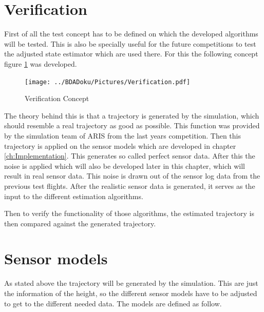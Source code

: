 % 
%   

  
  \section{Verification}
  First of all the test concept has to be defined on which the developed algorithms will be tested.
  This is also be specially useful for the future competitions to test the adjusted state estimator which are used there.
  For this the following concept figure \ref{fig:Verification} was developed.
  
  \begin{figure}[h!]
   \centering
   \texttt{[image: ../BDADoku/Pictures/Verification.pdf]}
   \caption{Verification Concept}
   \label{fig:Verification}
  \end{figure}

  The theory behind this is that a trajectory is generated by the simulation, which should resemble a real trajectory as good as possible.
  This function was provided by the simulation team of ARIS from the last years competition.
  Then this trajectory is applied on the sensor models which are developed in chapter \ref{ch:Implementation}.
  This generates so called perfect sensor data. 
  After this the noise is applied which will also be developed later in this chapter, which will result in real sensor data. 
  This noise is drawn out of the sensor log data from the previous test flights.
  After the realistic sensor data is generated, it serves as the input to the different estimation algorithms.
  
  Then to verify the functionality of those algorithms, the estimated trajectory is then compared against the generated trajectory.
  
  
  \section{Sensor models}
  As stated above the trajectory will be generated by the simulation. 
  This are just the information of the height, so the different sensor models have to be adjusted to get to the different needed data.
  The models are defined as follow.
  
